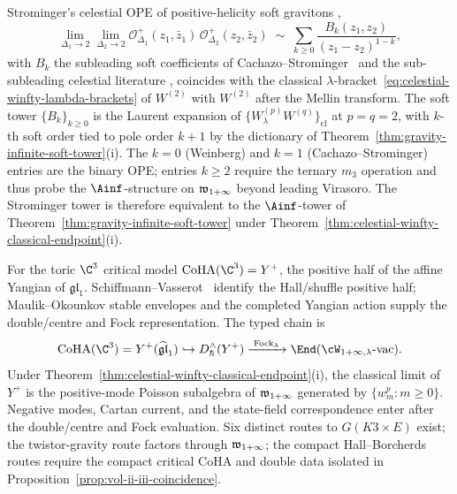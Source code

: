 \begin{remark}
\label{rem:soft-theorem-chiral-ope}
Strominger's celestial OPE of positive-helicity soft gravitons
\cite[eq.~(11)]{StromingerWInfinityCelestial},
\begin{equation}\label{eq:soft-graviton-ope}
\lim_{\Delta_1 \to 2}\lim_{\Delta_2 \to 2}
\mathcal{O}^+_{\Delta_1}(z_1, \bar z_1)\,\mathcal{O}^+_{\Delta_2}(z_2, \bar z_2)
\;\sim\;
\sum_{k \ge 0} \frac{B_k(z_1, z_2)}{(z_1 - z_2)^{1-k}},
\end{equation}
with $B_k$ the subleading soft coefficients of
Cachazo--Strominger~\cite{CachazoStrominger14} and
the sub-subleading celestial literature
\cite{CachazoStrominger14,HamadaShiuSubsubSoft}, coincides with the classical
$\lambda$-bracket~\eqref{eq:celestial-winfty-lambda-brackets} of
$W^{(2)}$ with $W^{(2)}$ after the Mellin transform. The soft tower
$\{B_k\}_{k \ge 0}$ is the Laurent expansion of
$\{W^{(p)}_\lambda W^{(q)}\}_{\mathrm{cl}}$ at $p = q = 2$, with
$k$-th soft order tied to pole order $k+1$ by the dictionary of
Theorem~\ref{thm:gravity-infinite-soft-tower}(i). The
$k = 0$ (Weinberg) and $k = 1$ (Cachazo--Strominger) entries are the
binary OPE; entries $k \ge 2$ require the ternary $m_3$ operation and
thus probe the $\Ainf$-structure on $\mathfrak{w}_{1+\infty}$ beyond leading Virasoro. The
Strominger tower is therefore equivalent to the $\Ainf$-tower of
Theorem~\ref{thm:gravity-infinite-soft-tower} under
Theorem~\ref{thm:celestial-winfty-classical-endpoint}(i).
\end{remark}

\begin{remark}
\label{rem:cross-vol-coha-winfty}
For the toric $\C^3$ critical model
$\mathrm{CoHA}(\C^3) = Y^+$, the positive half of the affine
Yangian of $\mathfrak{gl}_1$.
Schiffmann--Vasserot~\cite{SchiffmannVasserot13} identify the
Hall/shuffle positive half; Maulik--Okounkov stable envelopes and
the completed Yangian action supply the double/centre and Fock
representation. The typed chain is
\[
 \mathrm{CoHA}(\C^3)=Y^+(\widehat{\mathfrak{gl}}_1)
 \hookrightarrow D_\hbar^\wedge(Y^+)
 \xrightarrow{\;\mathrm{Fock}_\lambda\;}
 \End(\cW_{1+\infty,\lambda}\text{-}\mathrm{vac}).
\]
Under Theorem~\ref{thm:celestial-winfty-classical-endpoint}(i),
the classical limit of $Y^+$ is the positive-mode Poisson
subalgebra of $\mathfrak{w}_{1+\infty}$ generated by $\{w^p_m:m\ge0\}$. Negative
modes, Cartan current, and the state-field correspondence enter
after the double/centre and Fock evaluation. Six distinct routes
to $G(K3 \times E)$ exist; the twistor-gravity route factors
through $\mathfrak{w}_{1+\infty}$; the compact Hall--Borcherds routes require the
compact critical CoHA and double data isolated in
Proposition~\ref{prop:vol-ii-iii-coincidence}.
\end{remark}

